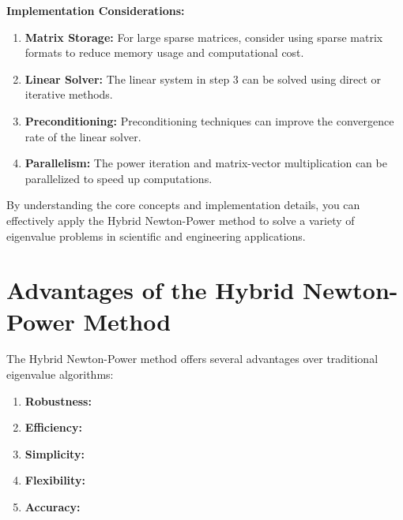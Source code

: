 \documentclass[journal,12pt,onecolumn]{IEEEtran}
\theoremstyle{remark}
\begin{document}
\textbf{Implementation Considerations:}
\begin{enumerate}
    \item \textbf{Matrix Storage:} For large sparse matrices, consider using sparse matrix formats to reduce memory usage and computational cost.
    \item \textbf{Linear Solver:} The linear system in step 3 can be solved using direct or iterative methods.
    \item \textbf{Preconditioning:} Preconditioning techniques can improve the convergence rate of the linear solver.
    \item \textbf{Parallelism:} The power iteration and matrix-vector multiplication can be parallelized to speed up computations.
\end{enumerate}

By understanding the core concepts and implementation details, you can effectively apply the Hybrid Newton-Power method to solve a variety of eigenvalue problems in scientific and engineering applications.

\section{Advantages of the Hybrid Newton-Power Method}

The Hybrid Newton-Power method offers several advantages over traditional eigenvalue algorithms:

\begin{enumerate}
    \item \textbf{Robustness:}
	    
	    
    
    \item \textbf{Efficiency:}
    
   
    
    \item \textbf{Simplicity:}
   

    
    \item \textbf{Flexibility:}
  
   
    
    \item \textbf{Accuracy:}
    
    
\end{enumerate}
\end{document}
